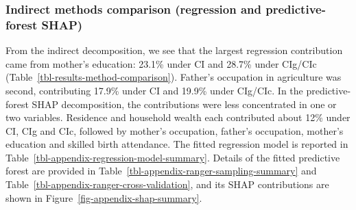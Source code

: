 \documentclass[
  11pt,
  a4paper,
]{article}
\begin{document}
\subsubsection{Indirect methods comparison (regression and
predictive-forest
SHAP)}\label{indirect-methods-comparison-regression-and-predictive-forest-shap}

From the indirect decomposition, we see that the largest regression
contribution came from mother's education: 23.1\% under CI and 28.7\%
under CIg/CIc (Table~\ref{tbl-results-method-comparison}). Father's
occupation in agriculture was second, contributing 17.9\% under CI and
19.9\% under CIg/CIc. In the predictive-forest SHAP decomposition, the
contributions were less concentrated in one or two variables. Residence
and household wealth each contributed about 12\% under CI, CIg and CIc,
followed by mother's occupation, father's occupation, mother's education
and skilled birth attendance. The fitted regression model is reported in
Table~\ref{tbl-appendix-regression-model-summary}. Details of the fitted
predictive forest are provided in
Table~\ref{tbl-appendix-ranger-sampling-summary} and
Table~\ref{tbl-appendix-ranger-cross-validation}, and its SHAP
contributions are shown in Figure~\ref{fig-appendix-shap-summary}.

\begingroup\fontsize{11}{13}\selectfont
\end{document}

